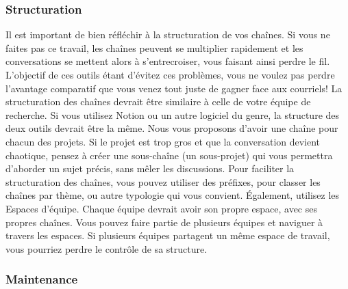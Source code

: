 \documentclass[
  letterpaper,
]{scrbook}
\begin{document}
\hypertarget{structuration}{%
\subsubsection{Structuration}\label{structuration}}

Il est important de bien réfléchir à la structuration de vos chaînes. Si
vous ne faites pas ce travail, les chaînes peuvent se multiplier
rapidement et les conversations se mettent alors à s'entrecroiser, vous
faisant ainsi perdre le fil. L'objectif de ces outils étant d'évitez ces
problèmes, vous ne voulez pas perdre l'avantage comparatif que vous
venez tout juste de gagner face aux courriels! La structuration des
chaînes devrait être similaire à celle de votre équipe de recherche. Si
vous utilisez Notion ou un autre logiciel du genre, la structure des
deux outils devrait être la même. Nous vous proposons d'avoir une chaîne
pour chacun des projets. Si le projet est trop gros et que la
conversation devient chaotique, pensez à créer une sous-chaîne (un
sous-projet) qui vous permettra d'aborder un sujet précis, sans mêler
les discussions. Pour faciliter la structuration des chaînes, vous
pouvez utiliser des préfixes, pour classer les chaînes par thème, ou
autre typologie qui vous convient. Également, utilisez les Espaces
d'équipe. Chaque équipe devrait avoir son propre espace, avec ses
propres chaînes. Vous pouvez faire partie de plusieurs équipes et
naviguer à travers les espaces. Si plusieurs équipes partagent un même
espace de travail, vous pourriez perdre le contrôle de sa structure.

\hypertarget{maintenance}{%
\subsubsection{Maintenance}\label{maintenance}}
\end{document}
